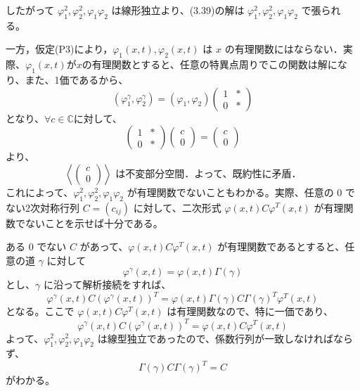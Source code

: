 \documentclass[paper=a4, fontsize=11pt]{jlreq} %
\theoremstyle{break}
\theoremstyle{qa}
\begin{document}
したがって $\varphi_1^2, \varphi_2^2, \varphi_1\varphi_2$ は線形独立より、(3.39)の解は $\varphi_1^2, \varphi_2^2, \varphi_1\varphi_2$ で張られる。

一方，仮定(P3)により，$\varphi_1(x,t), \varphi_2(x,t)$ は $x$ の有理関数にはならない．実際、$\varphi_{1}(x,t)$が$x$の有理関数とすると、任意の特異点周りでこの関数は解になり、また、1価であるから、
\begin{equation*}
    (\varphi_1^\gamma, \varphi_2^\gamma) = (\varphi_1, \varphi_2) 
    \begin{pmatrix}
        1 & * \\
        0 & *
    \end{pmatrix}
\end{equation*}
となり、$\forall c\in\mathbb{C}$に対して、
\begin{equation*}
    \begin{pmatrix}
        1 & * \\
        0 & *
    \end{pmatrix}
    \begin{pmatrix}
        c \\
        0
    \end{pmatrix}
    =
    \begin{pmatrix}
        c \\
        0
    \end{pmatrix}
\end{equation*}
より、
\begin{equation*}
    \left\langle \begin{pmatrix} c \\ 0 \end{pmatrix} \right\rangle \text{ は不変部分空間．よって、既約性に矛盾．}
\end{equation*}
これによって、$\varphi_1^2, \varphi_2^2, \varphi_1\varphi_2$ が有理関数でないこともわかる。実際、任意の $0$ でない2次対称行列 $C=(c_{ij})$ に対して、二次形式 $\varphi(x,t) C \varphi^{T}(x,t)$ が有理関数でないことを示せば十分である。

ある $0$ でない $C$ があって、$\varphi(x,t) C \varphi^{T}(x,t)$ が有理関数であるとすると、任意の道 $\gamma$ に対して
\begin{equation*}
    \varphi^{\gamma}(x,t) = \varphi(x,t)\Gamma(\gamma)
\end{equation*}
とし、$\gamma$ に沿って解析接続をすれば、
\begin{equation*}
    \varphi^{\gamma}(x,t) C (\varphi^{\gamma}(x,t))^{T} = \varphi(x,t)\Gamma(\gamma) C \Gamma(\gamma)^{T}\varphi^{T}(x,t)
\end{equation*}
となる。ここで $\varphi(x,t) C \varphi^{T}(x,t)$ は有理関数なので、特に一価であり、
\begin{equation*}
    \varphi^{\gamma}(x,t) C (\varphi^{\gamma}(x,t))^{T} = \varphi(x,t) C \varphi^{T}(x,t)
\end{equation*}
よって、$\varphi_1^2, \varphi_2^2, \varphi_1\varphi_2$ は線型独立であったので、係数行列が一致しなければならず、
\begin{equation*}
    \Gamma(\gamma) C \Gamma(\gamma)^{T} = C
\end{equation*}
がわかる。
\end{document}
